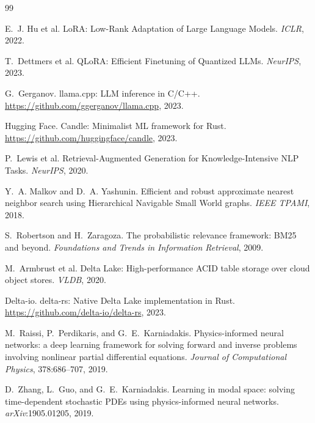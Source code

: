 \documentclass[11pt,a4paper]{article}
\theoremstyle{plain}
\theoremstyle{definition}
\begin{document}

\begin{thebibliography}{99}

E.~J. Hu et al.
\newblock LoRA: Low-Rank Adaptation of Large Language Models.
\newblock \emph{ICLR}, 2022.

T.~Dettmers et al.
\newblock QLoRA: Efficient Finetuning of Quantized LLMs.
\newblock \emph{NeurIPS}, 2023.

G.~Gerganov.
\newblock llama.cpp: LLM inference in C/C++.
\newblock \url{https://github.com/ggerganov/llama.cpp}, 2023.

Hugging Face.
\newblock Candle: Minimalist ML framework for Rust.
\newblock \url{https://github.com/huggingface/candle}, 2023.

P.~Lewis et al.
\newblock Retrieval-Augmented Generation for Knowledge-Intensive NLP Tasks.
\newblock \emph{NeurIPS}, 2020.

Y.~A. Malkov and D.~A. Yashunin.
\newblock Efficient and robust approximate nearest neighbor search using
Hierarchical Navigable Small World graphs.
\newblock \emph{IEEE TPAMI}, 2018.

S.~Robertson and H.~Zaragoza.
\newblock The probabilistic relevance framework: BM25 and beyond.
\newblock \emph{Foundations and Trends in Information Retrieval}, 2009.

M.~Armbrust et al.
\newblock Delta Lake: High-performance ACID table storage over cloud object stores.
\newblock \emph{VLDB}, 2020.

Delta-io.
\newblock delta-rs: Native Delta Lake implementation in Rust.
\newblock \url{https://github.com/delta-io/delta-rs}, 2023.


M.~Raissi, P.~Perdikaris, and G.~E.~Karniadakis.
\newblock Physics-informed neural networks: a deep learning framework for
solving forward and inverse problems involving nonlinear partial
differential equations.
\newblock \emph{Journal of Computational Physics}, 378:686--707, 2019.

D.~Zhang, L.~Guo, and G.~E.~Karniadakis.
\newblock Learning in modal space: solving time-dependent stochastic {PDEs}
using physics-informed neural networks.
\newblock \emph{arXiv}:1905.01205, 2019.


\end{thebibliography}
\end{document}
